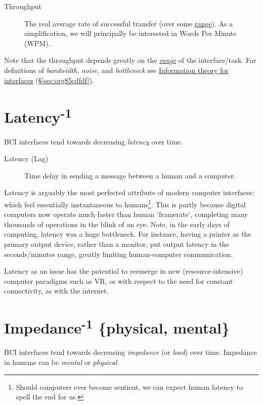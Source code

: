 \documentclass[logo,bsc,singlespacing,parskip]{infthesis}
\begin{document}
\begin{mdframed}
\begin{description}
\item[{Throughput\label{throughput}}] The real average rate of successful transfer (over some  \hyperref[range]{range}). As a simplification, we will principally be interested in Words Per Minute (WPM).
\end{description}
\end{mdframed}

Note that the throughput depends greatly on the \emph{\hyperref[range]{range}} of the interface/task.
For definitions of \emph{bandwidth}, \emph{noise}, and \emph{bottleneck} see \hyperref[sec:org85cdfdf]{Information theory for interfaces} (\S \ref{sec:org85cdfdf}).

\section{Latency\textsuperscript{-1}}
\label{sec:orgdc4a06c}
BCI interfaces tend towards decreasing \emph{latency} over time.

\begin{mdframed}
\begin{description}
\item[{Latency\label{latency} (Lag)}] Time delay in sending a message between a human and a computer.
\end{description}
\end{mdframed}

Latency is arguably the most perfected attribute of modern computer interfaces: which feel essentially instantaneous to humans\footnote{Should computers ever become sentient, we can expect human latency to spell the end for us.}.
This is partly because digital computers now operate much faster than human 'framerate', completing many thousands of operations in the blink of an eye.
Note, in the early days of computing, latency was a huge bottleneck.
For instance, having a printer as the primary output device, rather than a monitor, put output latency in the seconds/minutes range, greatly limiting human-computer communication.

Latency as an issue has the potential to reemerge in new (resource-intensive) computer paradigms such as VR, or with respect to the need for constant connectivity, as with the internet.

\section{Impedance\textsuperscript{-1} \{physical, mental\}}
\label{sec:org8b96c2b}
BCI interfaces tend towards decreasing \emph{impedance} (or \emph{load}) over time.
Impedance in humans can be \emph{mental} or \emph{physical}.
\end{document}
